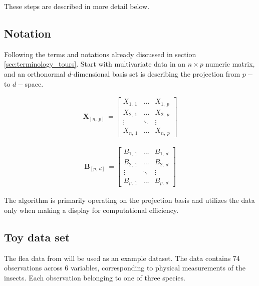 \documentclass{monashthesis}
\begin{document}
These steps are described in more detail below.

\subsection{Notation}\label{notation}

Following the terms and notations already discussed in section
\ref{sec:terminology_tours}. Start with multivariate data in an
\(n \times p\) numeric matrix, and an orthonormal \(d\)-dimensional
basis set is describing the projection from \(p-\) to \(d-\)space.

\begin{align*}
  \textbf{X}_{[n,~p]} ~=
  \begin{bmatrix}
    X_{1,~1} & \dots  & X_{1,~p} \\
    X_{2,~1} & \dots  & X_{2,~p} \\
    \vdots   & \ddots & \vdots   \\
    X_{n,~1} & \dots  & X_{n,~p}
  \end{bmatrix}
\end{align*}

\begin{align*}
  \textbf{B}_{[p,~d]} ~=
  \begin{bmatrix}
    B_{1,~1} & \dots  & B_{1,~d} \\
    B_{2,~1} & \dots  & B_{2,~d} \\
    \vdots   & \ddots & \vdots   \\
    B_{p,~1} & \dots  & B_{p,~d}
  \end{bmatrix}
\end{align*}

The algorithm is primarily operating on the projection basis and
utilizes the data only when making a display for computational
efficiency.

\subsection{Toy data set}\label{toy-data-set}

The flea data from \textcite{lubischew_use_1962} will be used as an
example dataset. The data contains 74 observations across 6 variables,
corresponding to physical measurements of the insects. Each observation
belonging to one of three species.
\end{document}
